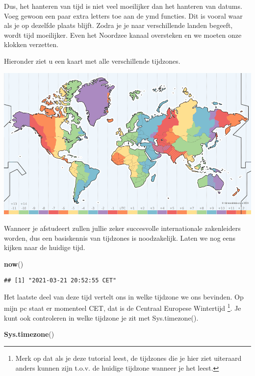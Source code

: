 \documentclass[]{tufte-book}
\newenvironment{Shaded}{}{}
\newcommand{\KeywordTok}[1]{\textcolor[rgb]{0.00,0.44,0.13}{\textbf{#1}}}
\newcommand{\NormalTok}[1]{#1}
\begin{document}
Dus, het hanteren van tijd is niet veel moeilijker dan het hanteren van datums. Voeg gewoon een paar extra letters toe aan de ymd functies. Dit is vooral waar als je op dezelfde plaats blijft. Zodra je je naar verschillende landen begeeft, wordt tijd moeilijker. Even het Noordzee kanaal oversteken en we moeten onze klokken verzetten.

Hieronder ziet u een kaart met alle verschillende tijdzones.

\begin{center}\includegraphics[width=1\linewidth]{images/timezones} \end{center}

Wanneer je afstudeert zullen jullie zeker succesvolle internationale zakenleiders worden, dus een basiskennis van tijdzones is noodzakelijk. Laten we nog eens kijken naar de huidige tijd.

\begin{Shaded}
\begin{Highlighting}[]
\KeywordTok{now}\NormalTok{()}
\end{Highlighting}
\end{Shaded}

\begin{verbatim}
## [1] "2021-03-21 20:52:55 CET"
\end{verbatim}

Het laatste deel van deze tijd vertelt ons in welke tijdzone we ons bevinden. Op mijn pc staat er momenteel CET, dat is de Centraal Europese Wintertijd \footnote{Merk op dat als je deze tutorial leest, de tijdzones die je hier ziet uiteraard anders kunnen zijn t.o.v. de huidige tijdzone wanneer je het leest.}. Je kunt ook controleren in welke tijdzone je zit met Sys.timezone().

\begin{Shaded}
\begin{Highlighting}[]
\KeywordTok{Sys.timezone}\NormalTok{()}
\end{Highlighting}
\end{Shaded}
\end{document}
